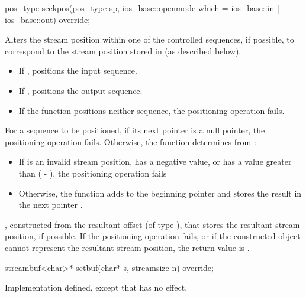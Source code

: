 %
\begin{itemdecl}
pos_type seekpos(pos_type sp, ios_base::openmode which
                  = ios_base::in | ios_base::out) override;
\end{itemdecl}

\begin{itemdescr}
\pnum
\effects
Alters the stream position within one of the
controlled sequences, if possible, to correspond to the
stream position stored in 
(as described below).
\begin{itemize}
\item
If
,
positions the input sequence.
\item
If
,
positions the output sequence.
\item
If the function positions neither sequence, the positioning operation fails.
\end{itemize}

\pnum
For a sequence to be positioned, if its next pointer is a null pointer,
the positioning operation fails.
Otherwise, the function determines  from
:
\begin{itemize}
\item
If  is an invalid stream position,
has a negative value, or
has a value greater than ( - ),
the positioning operation fails
\item
Otherwise, the function
adds  to the beginning pointer  and
stores the result in the next pointer .
\end{itemize}

\pnum
\returns
{},
constructed from the resultant offset 
(of type
),
that stores the resultant stream position, if possible.
If the positioning operation fails, or
if the constructed object cannot represent the resultant stream position,
the return value is
.
\end{itemdescr}

%
\begin{itemdecl}
streambuf<char>* setbuf(char* s, streamsize n) override;
\end{itemdecl}

\begin{itemdescr}
\pnum
\effects
Implementation defined, except that
has no effect.%
\end{itemdescr}

